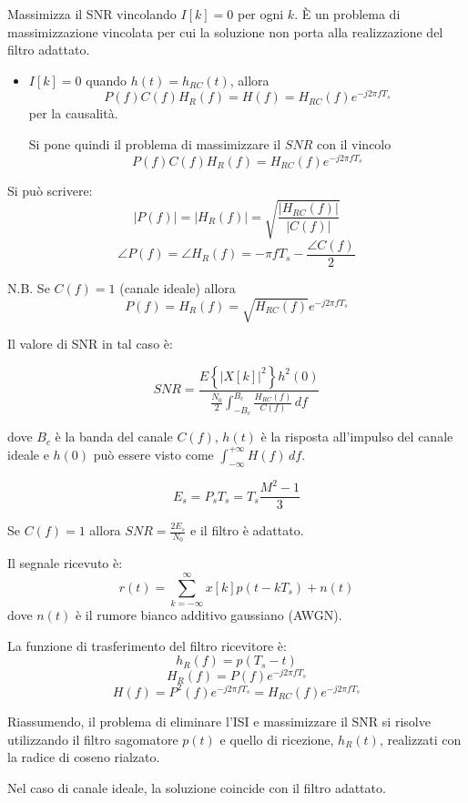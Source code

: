 Massimizza il SNR vincolando \( I[k] = 0 \) per ogni \( k \).  È un problema di massimizzazione vincolata per cui la soluzione non porta alla realizzazione del filtro adattato.

\begin{itemize}
    \item \( I[k] = 0 \) quando \( h(t) = h_{RC}(t) \), allora
          \[
              P(f) C(f) H_R(f) = H(f) = H_{RC}(f) e^{-j 2 \pi f T_s}
          \]
          per la causalità.

          Si pone quindi il problema di massimizzare il $SNR$ con il vincolo
          \[
              P(f) C(f) H_R(f) = H_{RC}(f) e^{-j 2 \pi f T_s}
          \]
\end{itemize}

Si può scrivere:
\[
    \left| P(f) \right| = \left| H_R(f) \right| = \sqrt{\frac{\left| H_{RC}(f) \right|}{\left| C(f) \right|}}
\]
\[
    \angle P(f) = \angle H_R(f) = - \pi f T_s - \frac{\angle C(f)}{2}
\]

N.B. Se \( C(f) = 1 \) (canale ideale) allora
\[
    P(f) = H_R(f) = \sqrt{H_{RC}(f)} e^{-j 2 \pi f T_s}
\]

Il valore di SNR in tal caso è:



\[
    SNR = \frac{E\left\{\left|X[k]\right|^2\right\} h^2(0)}{\frac{N_0}{2}
    \int_{-B_c}^{B_c} \frac{H_{RC}(f)}{C(f)}\, df }
\]

dove \( B_c \) è la banda del canale \( C(f) \), \( h(t) \) è la risposta all'impulso del canale ideale e $h(0)$ può essere visto come $
    \int_{-\infty}^{+\infty} H(f)\, df$.

\[
    E_s = P_s T_s = T_s \frac{M^2-1}{3}
\]

Se \( C(f) = 1 \) allora \( SNR = \frac{2 E_s}{N_0} \) e il filtro è adattato.

Il segnale ricevuto è:
\[
    r(t) = \sum_{k=-\infty}^{\infty} x[k] p(t - kT_s) + n(t)
\]
dove \( n(t) \) è il rumore bianco additivo gaussiano (AWGN).

La funzione di trasferimento del filtro ricevitore è:
\[
    h_{R}(f) = p (T_s - t)
\]
\[
    H_{R}(f) = P(f) e^{-j2\pi fT_s}
\]
\[
    H(f) = P^2(f) e^{-j2\pi fT_s} = H_{RC}(f) e^{-j2\pi fT_s}
\]

Riassumendo, il problema di eliminare l'ISI e massimizzare il SNR si risolve utilizzando il filtro sagomatore \( p(t) \) e quello di ricezione, \( h_R(t) \), realizzati con la radice di coseno rialzato.

Nel caso di canale ideale, la soluzione coincide con il filtro adattato.
